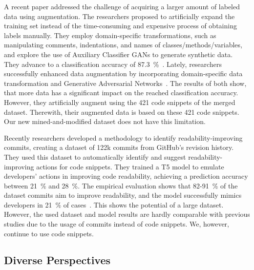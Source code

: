 \documentclass[%
class=scrreprt,
chapterprefix=false,%
open=right,%
twoside=false,%
paper=a4,%
logofile={Logo\_zentral\_farbig\_EN.png},%
thesistype=master,%
UKenglish,%
]{se2thesis}
\theoremstyle{definition}
\newcommand{\numMerged}{421\xspace}
\begin{document}
	A recent paper addressed the challenge of acquiring a larger amount of labeled data using augmentation. The researchers proposed to artificially expand the training set instead of the time-consuming and expensive process of obtaining labels manually. They employ domain-specific transformations, such as manipulating comments, indentations, and names of classes/methods/variables, and explore the use of Auxiliary Classifier GANs to generate synthetic data. They advance to a classification accuracy of 87.3~\%~\cite{mi2021effectiveness}.
	Lately, researchers successfully enhanced data augmentation by incorporating domain-specific data transformation and Generative Adversarial Networks~\cite{mi2022enhanced}.
	The results of both show, that more data has a significant impact on the reached classification accuracy. However, they artificially augment using the \numMerged code snippets of the merged dataset. Therewith, their augmented data is based on these \numMerged code snippets. Our new mined-and-modified dataset does not have this limitation.
	
	Recently researchers developed a methodology to identify readability-improving commits, creating a dataset of 122k commits from GitHub's revision history. They used this dataset to automatically identify and suggest readability-improving actions for code snippets. They trained a T5 model to emulate developers' actions in improving code readability, achieving a prediction accuracy between 21~\% and 28~\%. The empirical evaluation shows that 82-91~\% of the dataset commits aim to improve readability, and the model successfully mimics developers in 21~\% of cases~\cite{vitale2023using}.
	This shows the potential of a large dataset. However, the used dataset and model results are hardly comparable with previous studies due to the usage of commits instead of code snippets. We, however, continue to use code snippets.
		
	
\subsection{Diverse Perspectives} \label{Diverse Perspectives}
\end{document}
